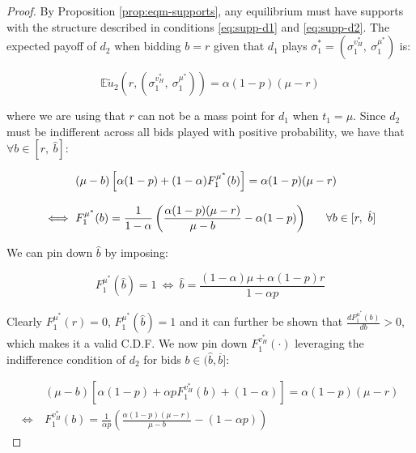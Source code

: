 \documentclass[11pt]{article}
\theoremstyle{plain}
\theoremstyle{definition}
\theoremstyle{plain}
\theoremstyle{plain}
\theoremstyle{plain}
\theoremstyle{plain}
\numberwithin{equation}{section}
\begin{document}
\begin{proof}
\noindent By Proposition \ref{prop:eqm-supports}, any equilibrium must have supports with the structure described in conditions \ref{eq:supp-d1} and \ref{eq:supp-d2}. The expected payoff of $ d_2 $ when bidding $ b = r $ given that $ d_1 $ plays $ \overline{\sigma}_1^* = \left( \sigma_1^{v_H^*},\ \sigma_1^{\mu^*} \right) $ is:

\vspace{0.2cm}

\begin{equation*}
    \mathbb{E}\tilde{u}_2 \left(r, \left(\sigma_1^{v_H^*},\ \sigma_1^{\mu^*} \right) \right) = \alpha (1 - p) (\mu - r)
\end{equation*}

\vspace{0.4cm}

\noindent where we are using that $ r $ can not be a mass point for $ d_1 $ when $ t_1 = \mu $. Since $ d_2 $ must be indifferent across all bids played with positive probability, we have that $ \forall b \in [r,\ \hat{b}] $:

\begin{align*}
    & (\mu - b) \left[ \alpha (1 - p) + (1 - \alpha) F_1^{\mu^*}(b) \right] = \alpha (1 - p) (\mu - r) \\[8pt]
    \iff \ & F_1^{\mu^*}(b) = \frac{1}{1 - \alpha} \left( \frac{\alpha (1 - p)(\mu - r)}{\mu - b} - \alpha (1 - p) \right) \hspace{0.6cm} \forall b \in [r,\ \hat{b}]
\end{align*}

\vspace{0.4cm}

\noindent We can pin down $ \hat{b} $ by imposing:

\begin{equation*}
     F_1^{\mu^*}(\hat{b}) = 1 \ \iff \ \hat{b} = \frac{(1 - \alpha) \mu + \alpha (1 - p) r}{1 - \alpha p} 
\end{equation*}

\vspace{4mm}

\noindent Clearly $ F_1^{\mu^*}(r) = 0 $, $ F_1^{\mu^*}(\hat{b}) = 1 $ and it can further be shown that $\frac{d F_1^{\mu^*}(b)}{db} > 0 $, which makes it a valid C.D.F. We now pin down $ F_1^{v_H^*}(\cdot) $ leveraging the indifference condition of $ d_2 $ for bids $ b \in (\hat{b},\overline{b}] $:

\begin{align*}
    & (\mu - b) \left[ \alpha(1 - p) + \alpha p F_1^{v_H^*}(b) + (1 - \alpha)  \right] = \alpha (1 - p) (\mu -r) \\[8pt]
    \iff \ & F_1^{v_H^*}(b) = \frac{1}{\alpha p} \left( \frac{\alpha (1 - p)(\mu - r)}{\mu - b} - (1 - \alpha p) \right)
\end{align*}


\end{proof}
\end{document}
